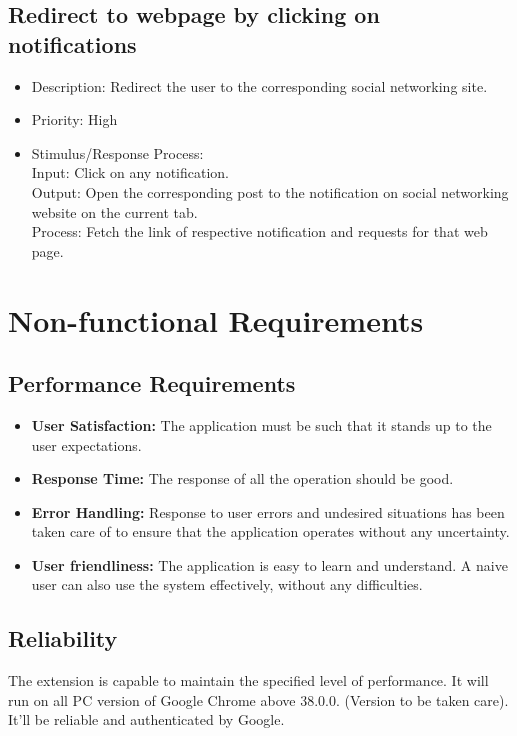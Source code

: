 \documentclass[12pt]{article}
\begin{document}
\subsection{Redirect to webpage by clicking on notifications}
\begin{itemize}
    \item  Description: Redirect the user to the corresponding social
networking site.
    \item  Priority: High
    \item 
 Stimulus/Response Process:\\
Input: Click on any notification.\\
Output: Open the corresponding post to the notification
on social networking website on the current tab.\\
Process: Fetch the link of respective notification and
requests for that web page.
\end{itemize}

\section{Non-functional Requirements}
\subsection{Performance Requirements}
\begin{itemize}
    \item \textbf{User Satisfaction:} The application must be such
that it stands up to the user expectations.
    \item \textbf{Response Time:} The response of all the operation
should be good.
    \item \textbf{Error Handling:} Response to user errors and
undesired situations has been taken care of to
ensure that the application operates without any
uncertainty.
    \item \textbf{User friendliness: }The application is easy to learn
and understand. A naive user can also use the system effectively,
without any difficulties.
\end{itemize}

\subsection{Reliability}
The extension is capable to maintain the specified level of
performance. It will run on all PC version of Google Chrome
above 38.0.0. (Version to be taken care). It’ll be reliable and authenticated by Google.
\end{document}
